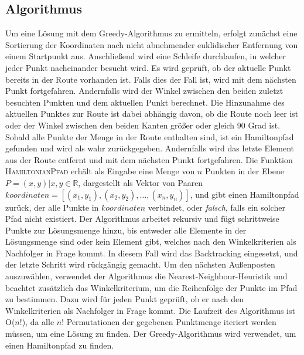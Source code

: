 \documentclass[a4paper,10pt,ngerman]{scrartcl}
\begin{document}
    \subsection{Algorithmus}\label{subsec:algorithmus}
    Um eine Lösung mit dem Greedy-Algorithmus zu ermitteln,
    erfolgt zunächst eine Sortierung der Koordinaten nach nicht abnehmender euklidischer Entfernung von einem Startpunkt aus.
    Anschließend wird eine Schleife durchlaufen, in welcher jeder Punkt nacheinander besucht wird.
    Es wird geprüft, ob der aktuelle Punkt bereits in der Route vorhanden ist.
    Falls dies der Fall ist, wird mit dem nächsten Punkt fortgefahren.
    Andernfalls wird der Winkel zwischen den beiden zuletzt besuchten Punkten und dem aktuellen Punkt berechnet.
    Die Hinzunahme des aktuellen Punktes zur Route ist dabei abhängig davon, ob die Route noch leer ist oder der Winkel zwischen den beiden Kanten größer oder gleich 90 Grad ist.
    Sobald alle Punkte der Menge in der Route enthalten sind, ist ein Hamiltonpfad gefunden und wird als wahr zurückgegeben.
    Andernfalls wird das letzte Element aus der Route entfernt und mit dem nächsten Punkt fortgefahren.
    \newline\newline
    Die Funktion \textsc{HamiltonianPfad} erhält als Eingabe eine Menge von $n$ Punkten in der Ebene $P={(x,y)| x,y \in \mathbb{R}}$,
    dargestellt als Vektor von Paaren $\textit{koordinaten}=[(x_1,y_1), (x_2,y_2),\dots, (x_n,y_n)]$, und gibt einen Hamiltonpfad zurück,
    der alle Punkte in $\textit{koordinaten}$ verbindet, oder \textit{falsch}, falls ein solcher Pfad nicht existiert.
    Der Algorithmus arbeitet rekursiv und fügt schrittweise Punkte zur Lösungsmenge hinzu, bis entweder alle Elemente in der Lösungsmenge sind oder kein Element gibt,
    welches nach den Winkelkriterien als Nachfolger in Frage kommt.
    In diesem Fall wird das Backtracking eingesetzt, und der letzte Schritt wird rückgängig gemacht.
    Um den nächsten Außenposten auszuwählen, verwendet der Algorithmus die Nearest-Neighbour-Heuristik und beachtet zusätzlich das Winkelkriterium,
    um die Reihenfolge der Punkte im Pfad zu bestimmen.
    Dazu wird für jeden Punkt geprüft, ob er nach den Winkelkriterien als Nachfolger in Frage kommt.
    Die Laufzeit des Algorithmus ist O($n!$), da alle $n!$ Permutationen der gegebenen Punktmenge iteriert werden müssen, um eine Lösung zu finden.
    \newline\newline
    Der Greedy-Algorithmus wird verwendet, um einen Hamiltonpfad zu finden.
\end{document}
